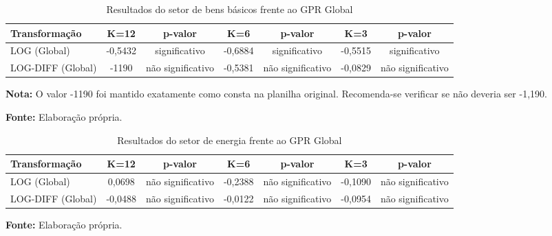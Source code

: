 \begin{table}[H]
\centering
\caption{Resultados do setor de bens básicos frente ao GPR Global}
\label{tab:setor-bens-basicos-gpr-global-resumo}
\small
\begin{adjustbox}{max width=\textwidth}
\begin{tabular}{@{}lcccccc@{}}
\toprule
Transformação & K=12 & p-valor & K=6 & p-valor & K=3 & p-valor \\
\midrule
LOG (Global) & -0,5432 & significativo & -0,6884 & significativo & -0,5515 & significativo \\
LOG-DIFF (Global) & -1190 & não significativo & -0,5381 & não significativo & -0,0829 & não significativo \\
\bottomrule
\end{tabular}
\end{adjustbox}
\vspace{1mm}
\begin{minipage}{\textwidth}
\footnotesize
\textbf{Nota:} O valor -1190 foi mantido exatamente como consta na planilha original. Recomenda-se verificar se não deveria ser -1,190.\par
\textbf{Fonte:} Elaboração própria.
\end{minipage}
\end{table}

\begin{table}[H]
\centering
\caption{Resultados do setor de energia frente ao GPR Global}
\label{tab:setor-energia-gpr-global}
\small
\begin{adjustbox}{max width=\textwidth}
\begin{tabular}{@{}lcccccc@{}}
\toprule
Transformação & K=12 & p-valor & K=6 & p-valor & K=3 & p-valor \\
\midrule
LOG (Global) & 0,0698 & não significativo & -0,2388 & não significativo & -0,1090 & não significativo \\
LOG-DIFF (Global) & -0,0488 & não significativo & -0,0122 & não significativo & -0,0954 & não significativo \\
\bottomrule
\end{tabular}
\end{adjustbox}
\vspace{1mm}
\begin{minipage}{\textwidth}
\footnotesize
\textbf{Fonte:} Elaboração própria.
\end{minipage}
\end{table}

\clearpage

